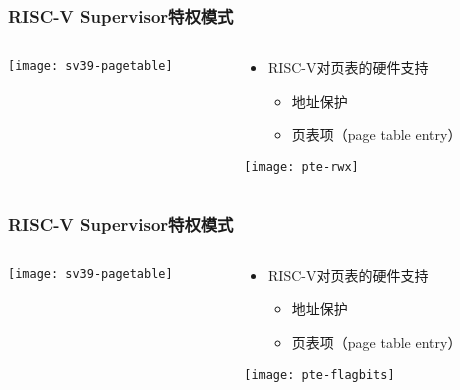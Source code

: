 \begin{frame}   
	\frametitle{RISC-V Supervisor特权模式}
	
	\begin{columns}[t]
		
		\begin{column}{.5\textwidth}
			
			\texttt{[image: sv39-pagetable]}
			
		\end{column}
		
		
		\begin{column}{.5\textwidth}
			
			\begin{itemize}\large
				\item RISC-V对页表的硬件支持
				\begin{itemize}
					\item 地址保护
					\item 页表项（page table entry）
					
					
				\end{itemize}
			\end{itemize}
			\texttt{[image: pte-rwx]}
		\end{column}
		
		
	\end{columns}
	
\end{frame}



\begin{frame}   
	\frametitle{RISC-V Supervisor特权模式}
	
	\begin{columns}[t]
		
		\begin{column}{.5\textwidth}
			
			\texttt{[image: sv39-pagetable]}
			
		\end{column}
		
		
		\begin{column}{.5\textwidth}
			
			\begin{itemize}\large
				\item RISC-V对页表的硬件支持
				\begin{itemize}
					\item 地址保护
					\item 页表项（page table entry）
					
					
				\end{itemize}
			\end{itemize}
			\texttt{[image: pte-flagbits]}
		\end{column}
		
		
	\end{columns}
	
\end{frame}


